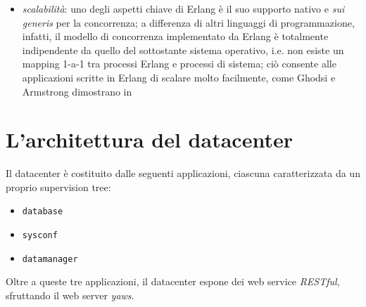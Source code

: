 \begin{itemize}
      da un elevato grado di \emph{reliability} e \emph{fault tolerance}\cite{armstrongreliability}
%
\item \emph{scalabilit\`a}: uno degli aspetti chiave di Erlang \`e il suo supporto nativo 
      e \emph{sui generis} per la concorrenza; a differenza di altri linguaggi di programmazione, 
      infatti, il modello di concorrenza  implementato da Erlang \`e totalmente indipendente da 
      quello del sottostante sistema operativo, i.e. non esiste un mapping 1-a-1 tra processi 
      Erlang e processi di sistema; ci\`o consente alle applicazioni scritte in Erlang di 
      scalare molto facilmente, come Ghodsi e Armstrong dimostrano in \cite{armstrongyaws}
\end{itemize}
%

\section{L'architettura del datacenter}
\label{datacenter-arch}
%
Il datacenter \`e costituito dalle seguenti applicazioni, ciascuna caratterizzata da un 
proprio supervision tree:
%
\begin{itemize}
\item \texttt{database}
\item \texttt{sysconf}
\item \texttt{datamanager}
\end{itemize}
%
Oltre a queste tre applicazioni, il datacenter espone dei web service \emph{RESTful}, 
sfruttando il web server \emph{yaws}\cite{yaws}.
%

%
